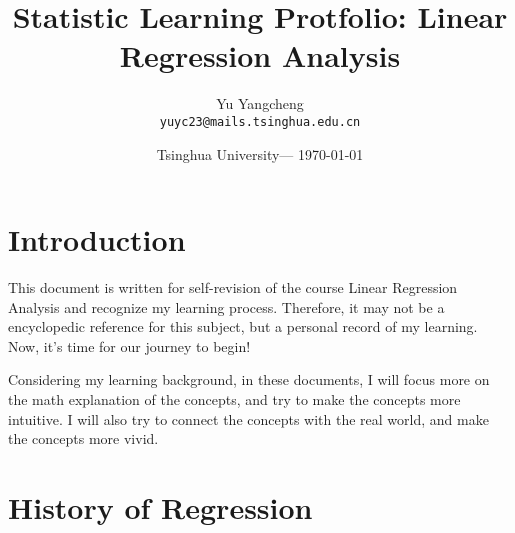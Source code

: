 \documentclass{article}
\title{Statistic Learning Protfolio: Linear Regression Analysis} %
\author{Yu Yangcheng\\ \texttt{yuyc23@mails.tsinghua.edu.cn}} %
\date{Tsinghua University--- \today} %
\begin{document}
\maketitle %


\section*{Introduction} %

This document is written for self-revision of the course Linear Regression Analysis and recognize my learning process. Therefore, it may not be a encyclopedic reference for this subject, but a personal record of my learning. Now, it's time for our journey to begin!

\begin{info} %
  Considering my learning background, in these documents, I will focus more on the math explanation of the concepts, and try to make the concepts more intuitive. I will also try to connect the concepts with the real world, and make the concepts more vivid.
\end{info}


\section{History of Regression} %
\end{document}
